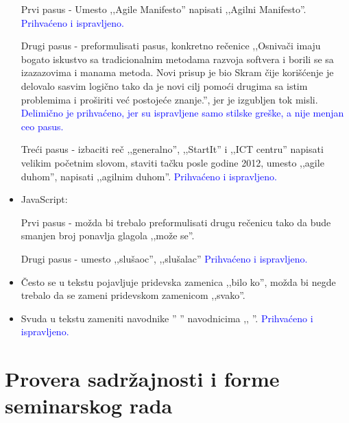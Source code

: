 \documentclass[a4paper]{report}
\newcommand{\odgovor}[1]{\textcolor{blue}{#1}}
\begin{document}
\begin{itemize}
    Prvi pasus - Umesto ,,Agile Manifesto'' napisati ,,Agilni Manifesto''.
    \odgovor{Prihvaćeno i ispravljeno.}
    
    Drugi pasus -  preformulisati pasus, konkretno rečenice ,,Osnivači imaju bogato iskustvo sa tradicionalnim metodama razvoja softvera i borili se sa izazazovima i manama metoda. Novi prisup je bio Skram čije korišćenje je delovalo sasvim logično tako da je novi cilj pomoći drugima sa istim problemima i proširiti već postojeće znanje.'', jer je izgubljen tok misli.
    \odgovor{Delimično je prihvaćeno, jer su ispravljene samo stilske greške, a nije menjan ceo pasus.}
    
    Treći pasus - izbaciti reč ,,generalno'', ,,StartIt'' i ,,ICT centru'' napisati velikim početnim slovom, staviti tačku posle godine 2012, umesto ,,agile duhom'', napisati ,,agilnim duhom''. 
    \odgovor{Prihvaćeno i ispravljeno.}
    \item JavaScript:
    
    Prvi pasus - možda bi trebalo preformulisati drugu rečenicu tako da bude smanjen broj ponavlja glagola ,,može se''.
    
    Drugi pasus - umesto ,,slušaoc'', ,,slušalac''
    \odgovor{Prihvaćeno i ispravljeno.} %
    \item Često se u tekstu pojavljuje pridevska zamenica ,,bilo ko'',  možda bi negde trebalo da se zameni pridevskom zamenicom ,,svako''.
    \odgovor{ } %
    \item Svuda u tekstu zameniti navodnike '' '' navodnicima ,, ''.
    \odgovor{Prihvaćeno i ispravljeno.} %
    
   
    
\end{itemize}
\section{Provera sadržajnosti i forme seminarskog rada}
\end{document}
